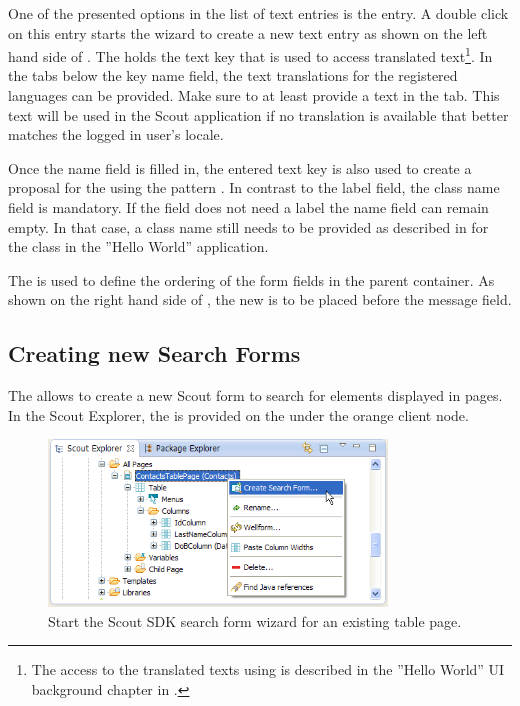 \documentclass[a4paper,10pt,twoside]{book}
\begin{document}
One of the presented options in the list of text entries is the  entry. 
A double click on this entry starts the wizard to create a new text entry as shown on the left hand side of . 
The  holds the text key that is used to access translated text\footnote{
The access to the translated texts using  is described in the ''Hello World'' UI background chapter in . 
}.
In the tabs below the key name field, the text translations for the registered languages can be provided. 
Make sure to at least provide a text in the  tab. 
This text will be used in the Scout application if no translation is available that better matches the logged in user's locale. 

Once the name field is filled in, the entered text key is also used to create a proposal for the  using the pattern . 
In contrast to the label field, the class name field is mandatory. 
If the field does not need a label the name field can remain empty. 
In that case, a class name still needs to be provided as described in  for the  class in the ''Hello World'' application. 

The  is used to define the ordering of the form fields in the parent container. 
As shown on the right hand side of , the new  is to be placed before the message field. 


\subsection{Creating new Search Forms}

The  allows to create a new Scout form to search for elements displayed in pages.  
In the Scout Explorer, the  is provided on the  under the orange client node. 

\begin{figure}
\includegraphics[width=9cm]{wizard_search_form_contextmenu.png}
\caption{Start the Scout SDK search form wizard for an existing table page.}
\end{figure}
\end{document}
